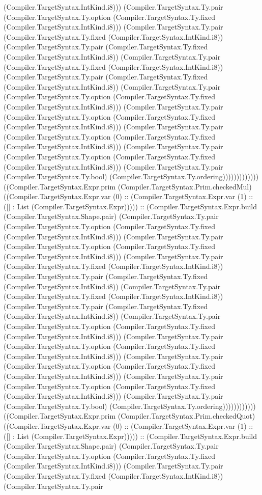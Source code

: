 \documentclass[11pt]{article}
\begin{document}
(Compiler.TargetSyntax.IntKind.i8))) (Compiler.TargetSyntax.Ty.pair (Compiler.TargetSyntax.Ty.option (Compiler.TargetSyntax.Ty.fixed (Compiler.TargetSyntax.IntKind.i8))) (Compiler.TargetSyntax.Ty.pair (Compiler.TargetSyntax.Ty.fixed (Compiler.TargetSyntax.IntKind.i8)) (Compiler.TargetSyntax.Ty.pair (Compiler.TargetSyntax.Ty.fixed (Compiler.TargetSyntax.IntKind.i8)) (Compiler.TargetSyntax.Ty.pair (Compiler.TargetSyntax.Ty.fixed (Compiler.TargetSyntax.IntKind.i8)) (Compiler.TargetSyntax.Ty.pair (Compiler.TargetSyntax.Ty.fixed (Compiler.TargetSyntax.IntKind.i8)) (Compiler.TargetSyntax.Ty.pair (Compiler.TargetSyntax.Ty.option (Compiler.TargetSyntax.Ty.fixed (Compiler.TargetSyntax.IntKind.i8))) (Compiler.TargetSyntax.Ty.pair (Compiler.TargetSyntax.Ty.option (Compiler.TargetSyntax.Ty.fixed (Compiler.TargetSyntax.IntKind.i8))) (Compiler.TargetSyntax.Ty.pair (Compiler.TargetSyntax.Ty.option (Compiler.TargetSyntax.Ty.fixed (Compiler.TargetSyntax.IntKind.i8))) (Compiler.TargetSyntax.Ty.pair (Compiler.TargetSyntax.Ty.option (Compiler.TargetSyntax.Ty.fixed (Compiler.TargetSyntax.IntKind.i8))) (Compiler.TargetSyntax.Ty.pair (Compiler.TargetSyntax.Ty.bool) (Compiler.TargetSyntax.Ty.ordering))))))))))))) ((Compiler.TargetSyntax.Expr.prim (Compiler.TargetSyntax.Prim.checkedMul) ((Compiler.TargetSyntax.Expr.var (0) :: (Compiler.TargetSyntax.Expr.var (1) :: ([] : List (Compiler.TargetSyntax.Expr))))) :: (Compiler.TargetSyntax.Expr.build (Compiler.TargetSyntax.Shape.pair) (Compiler.TargetSyntax.Ty.pair (Compiler.TargetSyntax.Ty.option (Compiler.TargetSyntax.Ty.fixed (Compiler.TargetSyntax.IntKind.i8))) (Compiler.TargetSyntax.Ty.pair (Compiler.TargetSyntax.Ty.option (Compiler.TargetSyntax.Ty.fixed (Compiler.TargetSyntax.IntKind.i8))) (Compiler.TargetSyntax.Ty.pair (Compiler.TargetSyntax.Ty.fixed (Compiler.TargetSyntax.IntKind.i8)) (Compiler.TargetSyntax.Ty.pair (Compiler.TargetSyntax.Ty.fixed (Compiler.TargetSyntax.IntKind.i8)) (Compiler.TargetSyntax.Ty.pair (Compiler.TargetSyntax.Ty.fixed (Compiler.TargetSyntax.IntKind.i8)) (Compiler.TargetSyntax.Ty.pair (Compiler.TargetSyntax.Ty.fixed (Compiler.TargetSyntax.IntKind.i8)) (Compiler.TargetSyntax.Ty.pair (Compiler.TargetSyntax.Ty.option (Compiler.TargetSyntax.Ty.fixed (Compiler.TargetSyntax.IntKind.i8))) (Compiler.TargetSyntax.Ty.pair (Compiler.TargetSyntax.Ty.option (Compiler.TargetSyntax.Ty.fixed (Compiler.TargetSyntax.IntKind.i8))) (Compiler.TargetSyntax.Ty.pair (Compiler.TargetSyntax.Ty.option (Compiler.TargetSyntax.Ty.fixed (Compiler.TargetSyntax.IntKind.i8))) (Compiler.TargetSyntax.Ty.pair (Compiler.TargetSyntax.Ty.option (Compiler.TargetSyntax.Ty.fixed (Compiler.TargetSyntax.IntKind.i8))) (Compiler.TargetSyntax.Ty.pair (Compiler.TargetSyntax.Ty.bool) (Compiler.TargetSyntax.Ty.ordering)))))))))))) ((Compiler.TargetSyntax.Expr.prim (Compiler.TargetSyntax.Prim.checkedQuot) ((Compiler.TargetSyntax.Expr.var (0) :: (Compiler.TargetSyntax.Expr.var (1) :: ([] : List (Compiler.TargetSyntax.Expr))))) :: (Compiler.TargetSyntax.Expr.build (Compiler.TargetSyntax.Shape.pair) (Compiler.TargetSyntax.Ty.pair (Compiler.TargetSyntax.Ty.option (Compiler.TargetSyntax.Ty.fixed (Compiler.TargetSyntax.IntKind.i8))) (Compiler.TargetSyntax.Ty.pair (Compiler.TargetSyntax.Ty.fixed (Compiler.TargetSyntax.IntKind.i8)) (Compiler.TargetSyntax.Ty.pair 
\end{document}
